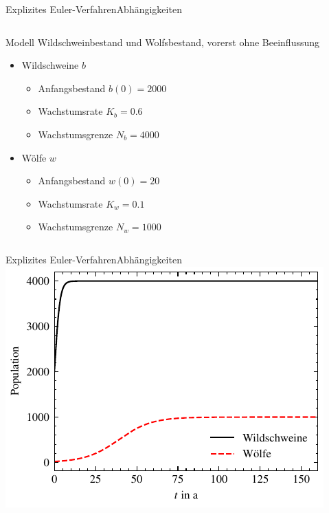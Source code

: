 \documentclass[xelatex,aspectratio=169]{beamer}
\begin{document}
\begin{frame}{Explizites Euler-Verfahren}{Abhängigkeiten}
    \begin{columns}
        \begin{column}{0.5\textwidth}
            \begin{block}{Modell}
                Wildschweinbestand und Wolfsbestand, vorerst ohne Beeinflussung
                \begin{itemize}
                    \item Wildschweine $b$
                          \begin{itemize}
                              \item Anfangsbestand $b(0) = 2000$
                              \item Wachstumsrate $K_b = 0.6$
                              \item Wachstumsgrenze $N_b = 4000$
                          \end{itemize}
                    \item Wölfe $w$
                          \begin{itemize}
                              \item Anfangsbestand $w(0) = 20$
                              \item Wachstumsrate $K_w = 0.1$
                              \item Wachstumsgrenze $N_w = 1000$
                          \end{itemize}
                \end{itemize}
            \end{block}
        \end{column}
        \begin{column}{0.5\textwidth}
            \smaller
            \inputminted[firstline=7, lastline=21]{python}{src/sim_dependency_a.py}
        \end{column}
    \end{columns}
\end{frame}

\begin{frame}{Explizites Euler-Verfahren}{Abhängigkeiten}
    \centering
    \includegraphics[height=.8\textheight]{fig/sim_dependency_a.pdf}
\end{frame}
\end{document}
